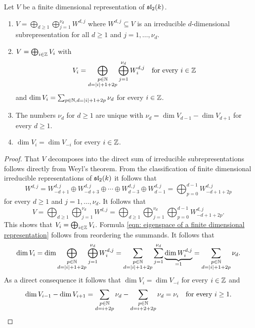 \begin{thrm}
 Let $V$ be a finite dimensional representation of $\mathfrak{sl}_2(k)$.
 \begin{enumerate}[leftmargin=*]
  \item
   $V = \bigoplus_{d \geq 1} \bigoplus_{j=1}^{\nu_d} W^{d,j}$ where $W^{d,j} \subseteq V$ is an irreducible $d$-dimensional subrepresentation for all $d \geq 1$ and $j = 1, \dotsc, \nu_d$.
  \item
   $V = \bigoplus_{i \in \mathbb{Z}} V_i$ with
   \begin{equation}\label{eqn: eigenspace of a finite dimensional representation}
    V_i = \bigoplus_{\substack{p \in \mathbb{N} \\ d = |i|+1+2p}} \bigoplus_{j=1}^{\nu_d} W^{d,j}_i
    \quad \text{for every $i \in \mathbb{Z}$}
   \end{equation}
   and $\dim V_i = \sum_{p \in \mathbb{N}, d = |i|+1+2p} \nu_d$ for every $i \in \mathbb{Z}$.
  \item 
   The numbers $\nu_d$ for $d \geq 1$ are unique with $\nu_d = \dim V_{d-1} - \dim V_{d+1}$ for every $d \geq 1$.
  \item
   $\dim V_i = \dim V_{-i}$ for every $i \in \mathbb{Z}$.
 \end{enumerate}
\end{thrm}
\begin{proof}
 That $V$ decomposes into the direct sum of irreducible subrepresentations follows directly from Weyl’s theorem. From the classification of finite dimensional irreducible representations of $\mathfrak{sl}_2(k)$ it follows that
 \[
  W^{d,j}
  = W^{d,j}_{-d+1} \oplus W^{d,j}_{-d+3} \oplus \dotsb \oplus W^{d,j}_{d-3} \oplus W^{d,j}_{d-1}
  = \bigoplus_{p=0}^{d-1} W^{d,j}_{-d+1+2p}
 \]
 for every $d \geq 1$ and $j = 1, \dotsc, \nu_d$. It follows that
 \[
  V
  = \bigoplus_{d \geq 1} \bigoplus_{j=1}^{\nu_d} W^{d,j}
  = \bigoplus_{d \geq 1} \bigoplus_{j=1}^{\nu_d} \bigoplus_{p=0}^{d-1} W^{d,j}_{-d+1+2p}.
 \]
 This shows that $V_i = \bigoplus_{i \in \mathbb{Z}} V_i$. Formula \eqref{eqn: eigenspace of a finite dimensional representation} follows from reordering the summands. It follows that
 \[
  \dim V_i
  = \dim \bigoplus_{\substack{p \in \mathbb{N} \\ d = |i|+1+2p}} \bigoplus_{j=1}^{\nu_d} W^{d,j}_i
  = \sum_{\substack{p \in \mathbb{N} \\ d = |i|+1+2p}} \sum_{j=1}^{\nu_d} \underbrace{\dim W^{d,j}_i}_{=1}
  = \sum_{\substack{p \in \mathbb{N} \\ d = |i|+1+2p}} \nu_d.
 \]
 As a direct consequence it follows that $\dim V_i = \dim V_{-i}$ for every $i \in \mathbb{Z}$ and
 \[
  \dim V_{i-1} - \dim V_{i+1}
  = \sum_{\substack{p \in \mathbb{N} \\ d = i+2p}} \nu_d - \sum_{\substack{p \in \mathbb{N} \\ d = i+2+2p}} \nu_d
  = \nu_i
  \quad\text{for every $i \geq 1$}.
 \qedhere
 \]
\end{proof}














